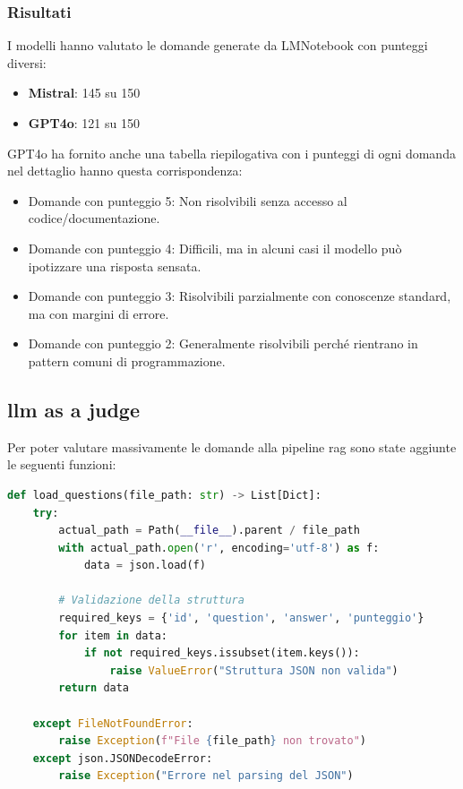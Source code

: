 \documentclass[12pt,a4paper,openright,twoside]{book}
\begin{document}
\subsubsection{Risultati}
I modelli hanno valutato le domande generate da LMNotebook con punteggi diversi:
\begin{itemize}
    \item \textbf{Mistral}: 145 su 150
    \item \textbf{GPT4o}: 121 su 150
\end{itemize}
GPT4o ha fornito anche una tabella riepilogativa con i punteggi di ogni domanda nel dettaglio hanno questa corrispondenza:
\begin{itemize}
    \item Domande con punteggio 5: Non risolvibili senza accesso al codice/documentazione.
    \item Domande con punteggio 4: Difficili, ma in alcuni casi il modello può ipotizzare una risposta sensata.
    \item Domande con punteggio 3: Risolvibili parzialmente con conoscenze standard, ma con margini di errore.
    \item Domande con punteggio 2: Generalmente risolvibili perché rientrano in pattern comuni di programmazione.
\end{itemize}

\subsection{llm as a judge}
Per poter valutare massivamente le domande alla pipeline rag sono state aggiunte le seguenti funzioni:
\begin{lstlisting}[language=Python, caption={funzione load\_questions}, label={lst:funzione load_questions}]
def load_questions(file_path: str) -> List[Dict]:
    try:
        actual_path = Path(__file__).parent / file_path
        with actual_path.open('r', encoding='utf-8') as f:
            data = json.load(f)
            
        # Validazione della struttura
        required_keys = {'id', 'question', 'answer', 'punteggio'}
        for item in data:
            if not required_keys.issubset(item.keys()):
                raise ValueError("Struttura JSON non valida")
        return data
        
    except FileNotFoundError:
        raise Exception(f"File {file_path} non trovato")
    except json.JSONDecodeError:
        raise Exception("Errore nel parsing del JSON")
\end{lstlisting}
\end{document}
